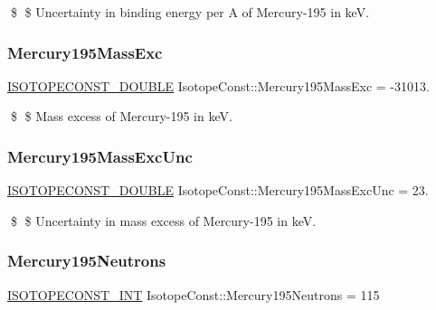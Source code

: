 \$ \$ Uncertainty in binding energy per A of Mercury-\/195 in keV. \mbox{\label{group___isotope_const-_mercury-_hg195_ga0a52d83fa8ae100fafc4d771e535aaa8}} 
\subsubsection{\texorpdfstring{Mercury195\+Mass\+Exc}{Mercury195MassExc}}
{\footnotesize\ttfamily \mbox{\hyperlink{group___isotope_const-_macros_ga8f45a7272ce02c0b4c65c44636ed719a}{I\+S\+O\+T\+O\+P\+E\+C\+O\+N\+S\+T\+\_\+\+D\+O\+U\+B\+LE}} Isotope\+Const\+::\+Mercury195\+Mass\+Exc = -\/31013.}

\$ \$ Mass excess of Mercury-\/195 in keV. \mbox{\label{group___isotope_const-_mercury-_hg195_ga408253d2e428d26de0f3148e1720428a}} 
\subsubsection{\texorpdfstring{Mercury195\+Mass\+Exc\+Unc}{Mercury195MassExcUnc}}
{\footnotesize\ttfamily \mbox{\hyperlink{group___isotope_const-_macros_ga8f45a7272ce02c0b4c65c44636ed719a}{I\+S\+O\+T\+O\+P\+E\+C\+O\+N\+S\+T\+\_\+\+D\+O\+U\+B\+LE}} Isotope\+Const\+::\+Mercury195\+Mass\+Exc\+Unc = 23.}

\$ \$ Uncertainty in mass excess of Mercury-\/195 in keV. \mbox{\label{group___isotope_const-_mercury-_hg195_ga239f35eac7060ee658daa72f97e49d4f}} 
\subsubsection{\texorpdfstring{Mercury195\+Neutrons}{Mercury195Neutrons}}
{\footnotesize\ttfamily \mbox{\hyperlink{group___isotope_const-_macros_ga5f18360b3e99483a35c32d789e62621c}{I\+S\+O\+T\+O\+P\+E\+C\+O\+N\+S\+T\+\_\+\+I\+NT}} Isotope\+Const\+::\+Mercury195\+Neutrons = 115}

